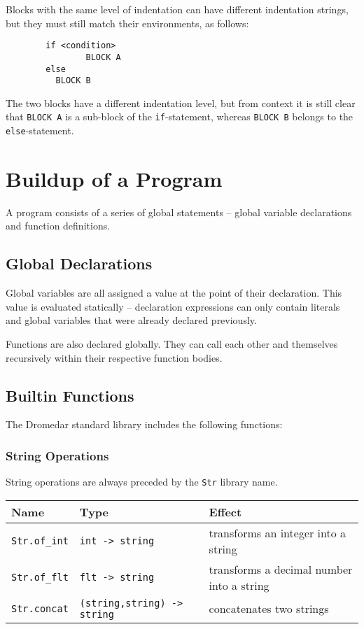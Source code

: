 \documentclass{article}
\newcommand{\code}[1]{\lstinline[columns=fixed]{#1}}
\begin{document}
		Blocks with the same level of indentation can have different indentation strings, but they must still match their environments, as follows:
		
		\begin{lstlisting}
		if <condition>
				BLOCK A
		else
		  BLOCK B
		\end{lstlisting}
		
		The two blocks have a different indentation level, but from context it is still clear that \code{BLOCK A} is a sub-block of the \code{if}-statement, whereas \code{BLOCK B} belongs to the \code{else}-statement.
		
	\section{Buildup of a Program}
	
		A program consists of a series of global statements -- global variable declarations and function definitions.
		
		\subsection{Global Declarations}
		
			Global variables are all assigned a value at the point of their declaration. This value is evaluated statically -- declaration expressions can only contain literals and global variables that were already declared previously.
			
			Functions are also declared globally. They can call each other and themselves recursively within their respective function bodies.
			
		\subsection{Builtin Functions}
		
			The Dromedar standard library includes the following functions:
			
			\subsubsection{String Operations}
			
				String operations are always preceded by the \code{Str} library name.
			
				\begin{longtable}{l|l|l}
					\textbf{Name} & \textbf{Type} & \textbf{Effect} \\
					\midrule
					\code{Str.of_int} & \code{int -> string} & transforms an integer into a string \\
					\code{Str.of_flt} & \code{flt -> string} & transforms a decimal number into a string \\
					\code{Str.concat} & \code{(string,string) -> string} & concatenates two strings
				\end{longtable}
			
\end{document}
